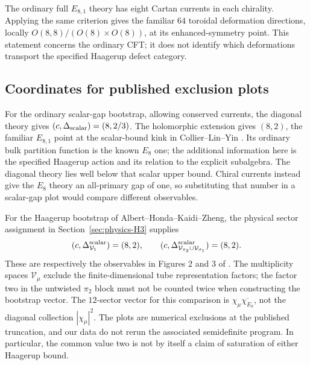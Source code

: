 \documentclass[11pt,a4paper]{article}
\theoremstyle{definition}
\begin{document}
The ordinary full $E_{8,1}$ theory has eight Cartan currents in each
chirality. Applying the same criterion gives the familiar $64$
toroidal deformation directions, locally
$O(8,8)/(O(8)\times O(8))$, at its enhanced-symmetry point. This
statement concerns the ordinary CFT; it does not identify which
deformations transport the specified Haagerup defect category.

\subsection{Coordinates for published exclusion plots}

For the ordinary scalar-gap bootstrap, allowing conserved currents,
the diagonal theory gives $(c,\Delta_{\rm scalar})=(8,2/3)$.
The holomorphic extension gives $(8,2)$, the familiar $E_{8,1}$ point
at the scalar-bound kink in Collier--Lin--Yin
\cite[Figure 8 and Section 3.3]{CLY}. Its ordinary bulk partition
function is the known $E_8$ one; the additional information here is
the specified Haagerup action and its relation to the explicit
subalgebra. The diagonal theory lies well below that scalar upper
bound. Chiral currents instead give the $E_8$ theory an all-primary
gap of one, so substituting that number in a scalar-gap plot would
compare different observables.

For the Haagerup bootstrap of Albert--Honda--Kaidi--Zheng, the physical
sector assignment in Section~\ref{sec:physics-H3} supplies
\begin{equation}\label{eq:physics-bootstrap-points}
 (c,\Delta_{\mathcal V_1}^{\rm scalar})=(8,2),\qquad
 (c,\Delta_{\mathcal V_{\pi_2}\cup\mathcal V_{\sigma_1}}^{\rm scalar})=(8,2).
\end{equation}
These are respectively the observables in Figures 2 and 3 of
\cite{AHKZ}. The multiplicity spaces $\mathcal V_\mu$ exclude the
finite-dimensional tube representation factors; the factor two in
the untwisted $\pi_2$ block must not be counted twice when constructing
the bootstrap vector. The $12$-sector vector for this comparison is
$\chi_\mu\overline{\chi_{E_8}}$, not the diagonal collection
$|\chi_\mu|^2$. The plots are numerical exclusions at the published
truncation, and our data do not rerun the associated semidefinite
program. In particular, the common value two is not by itself a
claim of saturation of either Haagerup bound.
\end{document}
